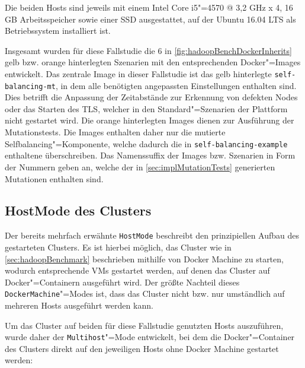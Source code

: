 Die beiden Hosts sind jeweils mit einem Intel Core i5"=4570 @ 3,2 GHz x 4, 16 GB Arbeitsspeicher sowie einer SSD ausgestattet, auf der Ubuntu 16.04 LTS als Betriebssystem installiert ist.

Insgesamt wurden für diese Fallstudie die 6 in \cref{fig:hadoopBenchDockerInherits} gelb bzw. orange hinterlegten Szenarien mit den entsprechenden Docker"=Images entwickelt.
Das zentrale Image in dieser Fallstudie ist das gelb hinterlegte \texttt{self-balancing-mt}, in dem alle benötigten angepassten Einstellungen enthalten sind.
Dies betrifft \zB die Anpassung der Zeitabstände zur Erkennung von defekten Nodes oder das Starten des \gls{TLS}, welcher in den Standard"=Szenarien der Plattform nicht gestartet wird.
Die orange hinterlegten Images dienen zur Ausführung der  Mutationstests.
Die Images enthalten daher nur die mutierte Selfbalancing"=Komponente, welche dadurch die in \texttt{self-balancing-example} enthaltene überschreiben.
Das Namenssuffix der Images bzw. Szenarien in Form der Nummern geben an, welche der in \cref{sec:implMutationTests} generierten Mutationen enthalten sind.

\subsection{HostMode des Clusters}
\label{subsec:hostMode}

Der bereits mehrfach erwähnte \texttt{HostMode} beschreibt den prinzipiellen Aufbau des gestarteten Clusters.
Es ist hierbei möglich, das Cluster wie in \cref{sec:hadoopBenchmark} beschrieben mithilfe von Docker Machine zu starten, wodurch entsprechende VMs gestartet werden, auf denen das Cluster auf Docker"=Containern ausgeführt wird.
Der größte Nachteil dieses \texttt{DockerMachine}"=Modes ist, dass das Cluster nicht bzw. nur umständlich auf mehreren Hosts ausgeführt werden kann.

Um das Cluster auf beiden für diese Fallstudie genutzten Hosts auszuführen, wurde daher der \texttt{Multihost}"=Mode entwickelt, bei dem die Docker"=Container des Clusters direkt auf den jeweiligen Hosts ohne Docker Machine gestartet werden:

